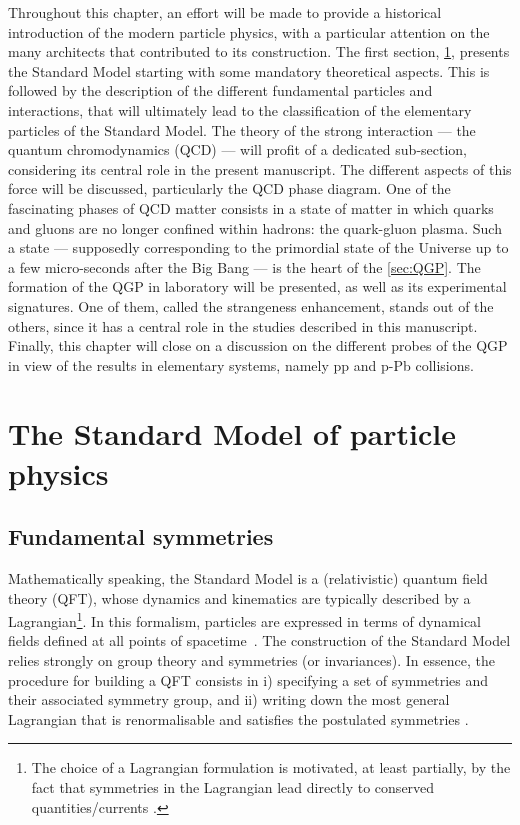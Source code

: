 Throughout this chapter, an effort will be made to provide a historical introduction of the modern particle physics, with a particular attention on the many architects that contributed to its construction. The first section, \Sec\ref{sec:StdModel}, presents the Standard Model starting with some mandatory theoretical aspects. This is followed by the description of the different fundamental particles and interactions, that will ultimately lead to the classification of the elementary particles of the Standard Model. The theory of the strong interaction --- the quantum chromodynamics (QCD) --- will profit of a dedicated sub-section, considering its central role in the present manuscript. The different aspects of this force will be discussed, particularly the QCD phase diagram. One of the fascinating phases of QCD matter consists in a state of matter in which quarks and gluons are no longer confined within hadrons: the quark-gluon plasma. Such a state --- supposedly corresponding to the primordial state of the Universe up to a few micro-seconds after the Big Bang ---  is the heart of the \Sec\ref{sec:QGP}. The formation of the QGP in laboratory will be presented, as well as its experimental signatures. One of them, called the strangeness enhancement, stands out of the others, since it has a central role in the studies described in this manuscript. Finally, this chapter will close on a discussion on the different probes of the QGP in view of the  results in elementary systems, namely pp and p-Pb collisions.


\section{The Standard Model of particle physics}
\label{sec:StdModel}

\subsection{Fundamental symmetries}
\label{subsec:Theory}

Mathematically speaking, the Standard Model is a (relativistic) quantum field theory (QFT), whose dynamics and kinematics are typically described by a Lagrangian\footnote{The choice of a Lagrangian formulation is motivated, at least partially, by the fact that symmetries in the Lagrangian lead directly to conserved quantities/currents \cite{kochAspectsChiralSymmetry1997}.}. In this formalism, particles are expressed in terms of dynamical fields defined at all points of spacetime~\cite{peskinIntroductionQuantumField2018}. The construction of the Standard Model relies strongly on group theory and symmetries (or invariances). In essence, the procedure for building a QFT consists in i) specifying a set of symmetries and their associated symmetry group, and ii) writing down the most general Lagrangian that is renormalisable and satisfies the postulated symmetries \cite{braibantParticlesFundamentalInteractions2012}.

